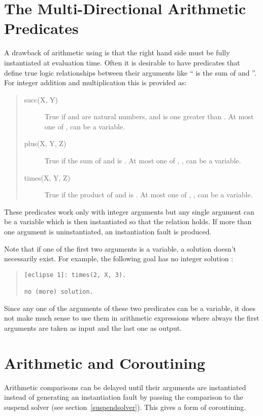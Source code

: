 \section{The Multi-Directional Arithmetic Predicates}%
A drawback of arithmetic using
 is that the right hand side
must
be fully instantiated at evaluation time.
Often it is desirable to have predicates that define true logic
relationships between their arguments like `` is the sum of 
and ''.
For integer addition and multiplication this is provided as:
\begin{quote}
\begin{description}
\item[succ(X, Y)]
True if and  are natural numbers, and  is one greater
than .
At most one of ,  can be a variable.

\item[plus(X, Y, Z)]
True if the sum of  and  is . At most one of
, ,  can be a variable.

\item[times(X, Y, Z)]
True if the product of  and  is . At most one of
, ,  can be a variable.

\end{description}
\end{quote}

These predicates work only with integer arguments but any single argument
can be a variable which is then instantiated so that the relation holds.
If more than one argument is uninstantiated, an instantiation fault is produced.

Note that if one of the first two arguments is a variable,
a solution doesn't necessarily exist. For example, the following goal has
no integer solution :
\begin{quote}
\begin{verbatim}
[eclipse 1]: times(2, X, 3).

no (more) solution.
\end{verbatim}\end{quote}

Since any one of the arguments of these two predicates can be a variable,
it does not make much sense to use them in arithmetic expressions
where always the first arguments are taken as input and the last
one as output.

\section{Arithmetic and Coroutining}
\label{arithdelay}

Arithmetic comparisons can be delayed until their arguments are
instantiated instead of generating an instantiation fault by passing the
comparison to the suspend solver (see section~\ref{suspendsolver}). This
gives a form of coroutining.


